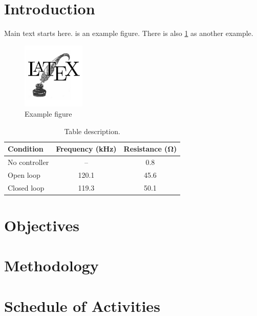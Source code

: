 \documentclass[english, a4paper, 11pt]{article}
\begin{document}
\newpage

\onehalfspacing

\section{Introduction}

Main text starts here.
 is an example figure.
There is also \cref{tab:example} as another example.

\begin{figure}[htp]
    \centering
    \includegraphics[width=3cm]{example}
    \caption{Example figure}
    \label{fig:example}
\end{figure}

\begin{table}[hbp]
    \centering
    \caption{Table description.}
    \label{tab:example}
    \begin{tabular}{lcc}
        \toprule
        Condition     & Frequency (\si{kHz}) & Resistance (\si{\ohm}) \\
        \midrule
        No controller & --                   & \num{0.8}              \\
        Open loop     & \num{120.1}          & \num{45.6}             \\
        Closed loop   & \num{119.3}          & \num{50.1}             \\
        \bottomrule
    \end{tabular}
\end{table}

\section{Objectives}

\section{Methodology}

\section{Schedule of Activities}
\end{document}
